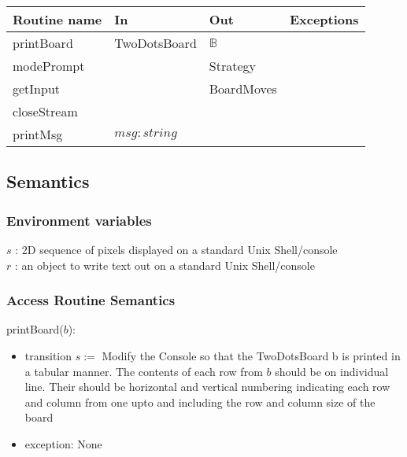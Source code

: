\documentclass[12pt]{article}
\begin{document}
\begin{tabular}{| l | l | l | p{6cm} |}
\hline
\textbf{Routine name} & \textbf{In} & \textbf{Out} & \textbf{Exceptions}\\
\hline
printBoard & TwoDotsBoard & $\mathbb{B}$& \\
\hline
modePrompt &  & Strategy & \\
\hline
getInput &  & BoardMoves & \\
\hline
closeStream &  &  & \\
\hline
printMsg & $msg : string$ &  & \\
\hline

\end{tabular}

\subsection* {Semantics}

\subsubsection* {Environment variables}
\noindent $s$ : 2D sequence of pixels displayed on a standard Unix Shell/console\\
\noindent $r$ : an object to write text out on a standard Unix Shell/console\\

\subsubsection* {Access Routine Semantics}

\noindent printBoard($b$): 
\begin{itemize}
\item transition $s:=$ Modify the Console so that the TwoDotsBoard b is printed in a tabular manner. The contents of each row from $b$ should
be on individual line. Their should be horizontal and vertical numbering indicating each row and column from one upto and including the row and column size of the board
\item exception: None
\end{itemize}
\end{document}
